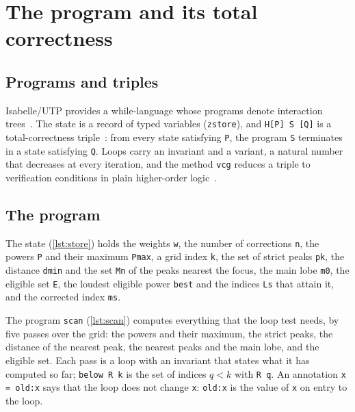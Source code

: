 \documentclass[11pt]{amsart}
\theoremstyle{plain}
\theoremstyle{definition}
\newcommand{\thy}[1]{\texttt{#1}}
\begin{document}





\section{The program and its total correctness}\label{sec:hoare}

\subsection{Programs and triples}

Isabelle/UTP provides a while-language whose programs denote interaction
trees~\cite{XiaEtAl2020,FosterHW24}.  The state is a record of typed variables (\thy{zstore}), and
\thy{H[P] S [Q]} is a total-correctness triple~\cite{Hoare1969,Floyd1967}: from every state satisfying
\thy{P}, the program \thy{S} terminates in a state satisfying \thy{Q}.  Loops carry an invariant and a
variant, a natural number that decreases at every iteration, and the method \thy{vcg} reduces a
triple to verification conditions in plain higher-order logic~\cite{BryantHF26}.

\subsection{The program}

The state (\cref{lst:store}) holds the weights \thy{w}, the number of corrections \thy{n}, the powers
\thy{P} and their maximum \thy{Pmax}, a grid index \thy{k}, the set of strict peaks \thy{pk}, the distance
\thy{dmin} and the set \thy{Mn} of the peaks nearest the focus, the main lobe \thy{m0}, the eligible set
\thy{E}, the loudest eligible power \thy{best} and the indices \thy{Ls} that attain it, and the corrected
index \thy{ms}.



The program \thy{scan} (\cref{lst:scan}) computes everything that the loop test needs, by five passes
over the grid: the powers and their maximum, the strict peaks, the distance of the nearest peak, the
nearest peaks and the main lobe, and the eligible set.  Each pass is a loop with an invariant that
states what it has computed so far; \thy{below R k} is the set of indices $q < k$ with \thy{R q}.  An
annotation \thy{x = old:x} says that the loop does not change \thy{x}: \thy{old:x} is the value of
\thy{x} on entry to the loop.
\end{document}
